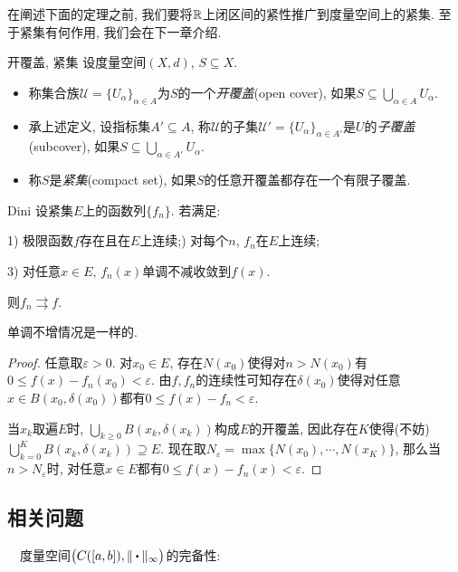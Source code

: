 在阐述下面的定理之前, 我们要将$\mathbb{R}$上闭区间的紧性推广到度量空间上的紧集. 至于紧集有何作用, 我们会在下一章介绍. 

\begin{definition}{开覆盖, 紧集}
	设度量空间$(X,d)$, $S \subseteq X$. 
	\begin{itemize}
		\item 称集合族$\mathcal{U} = \{ U_{\alpha} \}_{\alpha \in A}$为$S$的一个\textit{开覆盖}(open cover), 如果$S \subseteq \bigcup_{\alpha \in A} U_{\alpha}$. 
		\item 承上述定义, 设指标集$A' \subseteq A$, 称$\mathcal{U}$的子集$\mathcal{U}'= \{ U_{\alpha} \}_{\alpha \in A'}$是$U$的\textit{子覆盖}(subcover), 如果$S \subseteq \bigcup_{\alpha \in A'} U_{\alpha}$. 
		\item 称$S$是\textit{紧集}(compact set), 如果$S$的任意开覆盖都存在一个有限子覆盖. 
	\end{itemize}
\end{definition}

\begin{theorem}{Dini}
	设紧集$E$上的函数列$\{ f_n \}$. 若满足: 
	
	1) 极限函数$f$存在且在$E$上连续;) 对每个$n$, $f_n$在$E$上连续;
	
	3) 对任意$x \in E$, $f_n(x)$单调不减收敛到$f(x)$. 
	
	\noindent
	则$f_n \rightrightarrows f$. 
\end{theorem}
\begin{remark}
	单调不增情况是一样的. 
\end{remark}
\begin{proof}
	任意取$\varepsilon >0$. 对$x_0 \in E$, 存在$N(x_0)$使得对$n>N(x_0)$有$0 \leq f(x)-f_{n}(x_0) < \varepsilon$. 由$f,f_n$的连续性可知存在$\delta (x_0)$使得对任意$x \in B(x_0,\delta (x_0))$都有$0 \leq f(x)-f_{n} < \varepsilon$. 
	
	当$x_k$取遍$E$时, $\bigcup_{k\geq 0}B(x_k,\delta (x_k))$构成$E$的开覆盖, 因此存在$K$使得(不妨)$\bigcup_{k=0}^{K}B(x_k,\delta (x_k)) \supseteq E$. 现在取$N_\varepsilon = \max \{ N(x_0),\cdots ,N(x_K) \}$, 那么当$n>N_\varepsilon$时, 对任意$x \in E$都有$0 \leq f(x) - f_n(x) < \varepsilon$. 
\end{proof}


\subsection{相关问题}

~~度量空间$\big( C([a,b]),\| \bigcdot \|_{\infty} \big)$的完备性: 

